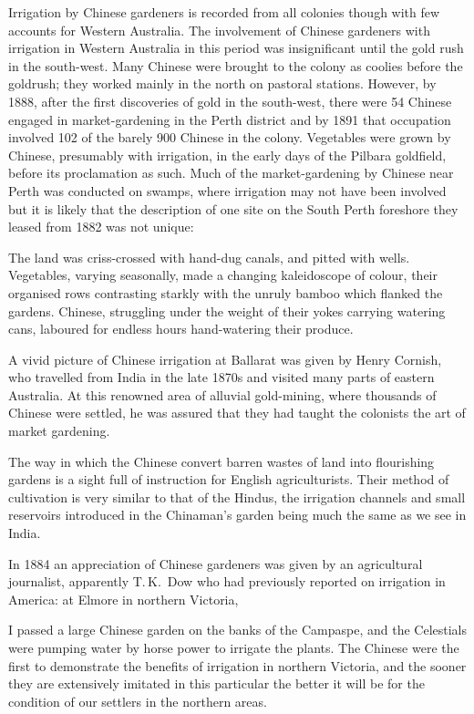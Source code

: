 Irrigation by Chinese  gardeners is recorded from all
colonies though with few accounts for Western
Australia.  The involvement of Chinese
gardeners with irrigation in Western Australia in this period was
insignificant until the gold rush in the south-west.  Many Chinese
were brought to the colony as coolies before the goldrush; they worked
main\-ly in the north on pastoral stations.  However, by 1888, after
the first discoveries of gold in the south-west, there were 54 Chinese
engaged in market-gardening in the Perth district and by 1891 that
occupation involved 102 of the barely 900 Chinese in the colony.
Vegetables were grown by Chinese, presumably with irrigation, in the
early days of the Pilbara
 goldfield, before its proclamation as
such.  Much of the market-gardening
by Chinese near Perth  was conducted on swamps, where
irrigation may not have been involved but it is likely that the
description of one site on the South Perth foreshore they leased from
1882 was not unique:
\begin{Quote}
	The land was criss-crossed with hand-dug canals, and pitted
	with wells.  Vegetables, varying seasonally, made a changing
	kaleidoscope of colour, their organised rows contrasting
	starkly with the unruly bamboo which flanked the gardens.
	Chinese, struggling under the weight of their yokes carrying
	watering cans, laboured for endless hours hand-watering their
	produce.
\end{Quote}

A vivid picture of Chinese irrigation at Ballarat  was given by Henry Cornish,  who travelled
from India in the late 1870s and visited many parts of eastern
Australia. At this renowned area of alluvial gold-min\-ing,
 where thousands of Chinese were settled, he was
assured that they had taught the colonists the art of market
gardening.
\begin{Quote}
	The way in which the Chinese convert barren wastes of land
	into flourishing gardens is a sight full of instruction for
	English agriculturists. Their method of cultivation is very
	similar to that of the Hindus, the irrigation channels and
	small reservoirs introduced in the Chinaman's garden being
	much the same as we see in India.
\end{Quote}

In 1884 an appreciation of Chinese gardeners was given by an
agricultural journalist, apparently T.\,K.~Dow  who
had previously reported on irrigation in America: at Elmore
 in 
northern Victoria,
\begin{Quote}
	I passed a large Chinese garden on the banks of the Campaspe,
	and the Celestials were pumping water by horse power to
	irrigate the plants.  The Chinese were the first to
	demonstrate the benefits of irrigation in northern Victoria,
	and the sooner they are extensively imitated in this
	particular the better it will be for the condition of our
	settlers in the northern areas.
\end{Quote}

